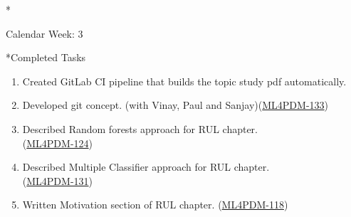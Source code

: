 \documentclass[11pt,a4paper]{article}
\begin{document}
\newpage
\begin{section}*{Calendar Week: 3 \hfill \date{22 January, 2021}}
 \begin{refsection}
   \begin{subsection}*{Completed Tasks}
     \begin{enumerate}
       \item
             Created GitLab CI pipeline that builds the topic study pdf automatically.
       \item
             Developed git concept. (with Vinay, Paul and Sanjay)(\href{https://ml4pdm.atlassian.net/browse/ML4PDM-133}{ML4PDM-133})
       \item
             Described Random forests approach \cite{GSCH:jennings2016forecasting, GSCH:cutler2012random} for RUL chapter.\\(\href{https://ml4pdm.atlassian.net/browse/ML4PDM-124}{ML4PDM-124})
       \item
             Described Multiple Classifier approach \cite{DBLP:journals/tii/SustoSPMB15} for RUL chapter.\\(\href{https://ml4pdm.atlassian.net/browse/ML4PDM-131}{ML4PDM-131})
       \item
             Written Motivation section of RUL chapter. (\href{https://ml4pdm.atlassian.net/browse/ML4PDM-118}{ML4PDM-118})
     \end{enumerate}
   \end{subsection}

   \printbibliography
 \end{refsection}
\end{section}
\end{document}
